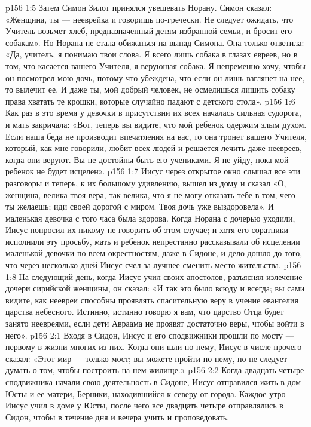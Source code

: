 \vs p156 1:5 Затем Симон Зилот принялся увещевать Норану. Симон сказал: «Женщина, ты --- нееврейка и говоришь по\hyp{}гречески. Не следует ожидать, что Учитель возьмет хлеб, предназначенный детям избранной семьи, и бросит его собакам». Но Норана не стала обижаться на выпад Симона. Она только ответила: «Да, учитель, я понимаю твои слова. Я всего лишь собака в глазах евреев, но в том, что касается вашего Учителя, я верующая собака. Я непременно хочу, чтобы он посмотрел мою дочь, потому что убеждена, что если он лишь взглянет на нее, то вылечит ее. И даже ты, мой добрый человек, не осмелишься лишить собаку права хватать те крошки, которые случайно падают с детского стола».
\vs p156 1:6 Как раз в это время у девочки в присутствии их всех началась сильная судорога, и мать закричала: «Вот, теперь вы видите, что мой ребенок одержим злым духом. Если наша беда не производит впечатления на вас, то она тронет вашего Учителя, который, как мне говорили, любит всех людей и решается лечить даже неевреев, когда они веруют. Вы не достойны быть его учениками. Я не уйду, пока мой ребенок не будет исцелен».
\vs p156 1:7 Иисус через открытое окно слышал все эти разговоры и теперь, к их большому удивлению, вышел из дому и сказал «О, женщина, велика твоя вера, так велика, что я не могу отказать тебе в том, чего ты желаешь; иди своей дорогой с миром. Твоя дочь уже выздоровела». И маленькая девочка с того часа была здорова. Когда Норана с дочерью уходили, Иисус попросил их никому не говорить об этом случае; и хотя его соратники исполнили эту просьбу, мать и ребенок непрестанно рассказывали об исцелении маленькой девочки по всем окрестностям, даже в Сидоне, и дело дошло до того, что через несколько дней Иисус счел за лучшее сменить место жительства.
\vs p156 1:8 \pc На следующий день, когда Иисус учил своих апостолов, разъяснял излечение дочери сирийской женщины, он сказал: «И так это было всюду и всегда; вы сами видите, как неевреи способны проявлять спасительную веру в учение евангелия царства небесного. Истинно, истинно говорю я вам, что царство Отца будет занято неевреями, если дети Авраама не проявят достаточно веры, чтобы войти в него».
\vs p156 2:1 Входя в Сидон, Иисус и его сподвижники прошли по мосту --- первому в жизни многих из них. Когда они шли по нему, Иисус в числе прочего сказал: «Этот мир --- только мост; вы можете пройти по нему, но не следует думать о том, чтобы построить на нем жилище.»
\vs p156 2:2 \pc Когда двадцать четыре сподвижника начали свою деятельность в Сидоне, Иисус отправился жить в дом Юсты и ее матери, Берники, находившийся к северу от города. Каждое утро Иисус учил в доме у Юсты, после чего все двадцать четыре отправлялись в Сидон, чтобы в течение дня и вечера учить и проповедовать.

